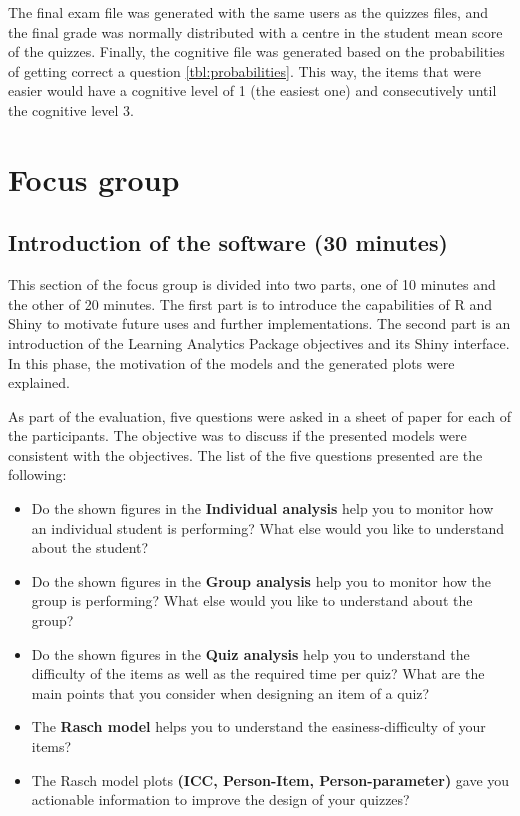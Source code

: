 The final exam file was generated with the same users as the quizzes files, and the final grade was normally distributed with a centre in the student mean score of the quizzes. Finally, the cognitive file was generated based on the probabilities of getting correct a question \cref{tbl:probabilities}. This way, the items that were easier would have a cognitive level of 1 (the easiest one) and consecutively until the cognitive level 3. 


\section{Focus group}

\subsection{Introduction of the software (30 minutes)}

This section of the focus group is divided into two parts, one of 10 minutes and the other of 20 minutes. The first part is to introduce the capabilities of R and Shiny to motivate future uses and further implementations. The second part is an introduction of the Learning Analytics Package objectives and its Shiny interface. In this phase, the motivation of the models and the generated plots were explained.

As part of the evaluation, five questions were asked in a sheet of paper for each of the participants. The objective was to discuss if the presented models were consistent with the objectives. The list of the five questions presented are the following:
  
  \begin{itemize}
\item{Do the shown figures in the \textbf{Individual analysis} help you to monitor how an individual student is performing? What else would you like to understand about the student?}
\item{Do the shown figures in the \textbf{Group analysis} help you to monitor how the group is performing?  What else would you like to understand about the group?}
\item{Do the shown figures in the \textbf{Quiz analysis} help you to understand the difficulty of the items as well as the required time per quiz? What are the main points that you consider when designing an item of a quiz?}
\item{The \textbf{Rasch model} helps you to understand the easiness-difficulty of your items?}
\item{The Rasch model plots \textbf{(ICC, Person-Item, Person-parameter)} gave you actionable information to improve the design of your quizzes?}
\end{itemize}

